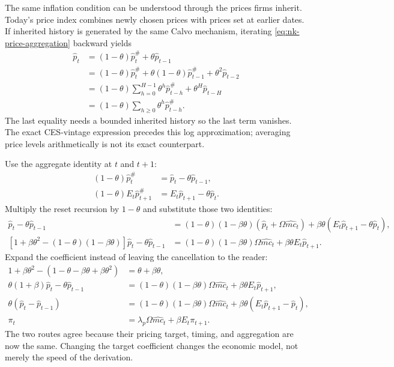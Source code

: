 The same inflation condition can be understood through the prices firms inherit.
Today's price index combines newly chosen prices with prices set at earlier
dates. If inherited history is generated by the same Calvo mechanism, iterating
\eqref{eq:nk-price-aggregation} backward yields
\begin{align}
 \hat p_t&=(1-\theta)\hat p_t^{\#}+\theta\hat p_{t-1}\\
 &=(1-\theta)\hat p_t^{\#}
       +\theta(1-\theta)\hat p_{t-1}^{\#}+\theta^2\hat p_{t-2}\\
 &=(1-\theta)\sum_{h=0}^{H-1}\theta^h\hat p_{t-h}^{\#}
                                     +\theta^H\hat p_{t-H}\\
 &=(1-\theta)\sum_{h\geq0}\theta^h\hat p_{t-h}^{\#}.
\end{align}
The last equality needs a bounded inherited history so the last term vanishes.
The exact CES-vintage expression precedes this log approximation; averaging
price levels arithmetically is not its exact counterpart.

Use the aggregate identity at $t$ and $t+1$:
\begin{align}
 (1-\theta)\hat p_t^{\#}&=\hat p_t-\theta\hat p_{t-1},\\
 (1-\theta)E_t\hat p_{t+1}^{\#}&=E_t\hat p_{t+1}-\theta\hat p_t.
\end{align}
Multiply the reset recursion by $1-\theta$ and substitute those two identities:
\begin{align}
 \hat p_t-\theta\hat p_{t-1}
 &=(1-\theta)(1-\beta\theta)
       (\hat p_t+\Omega\hat{mc}_t)
                 +\beta\theta(E_t\hat p_{t+1}-\theta\hat p_t),\\
 [1+\beta\theta^2-(1-\theta)(1-\beta\theta)]\hat p_t
       -\theta\hat p_{t-1}
 &=(1-\theta)(1-\beta\theta)\Omega\hat{mc}_t
                         +\beta\theta E_t\hat p_{t+1}.
\end{align}
Expand the coefficient instead of leaving the cancellation to the reader:
\begin{align}
 1+\beta\theta^2-(1-\theta-\beta\theta+\beta\theta^2)
 &=\theta+\beta\theta,\\
 \theta(1+\beta)\hat p_t-\theta\hat p_{t-1}
 &=(1-\theta)(1-\beta\theta)\Omega\hat{mc}_t
                       +\beta\theta E_t\hat p_{t+1},\\
 \theta(\hat p_t-\hat p_{t-1})
 &=(1-\theta)(1-\beta\theta)\Omega\hat{mc}_t
                    +\beta\theta(E_t\hat p_{t+1}-\hat p_t),\\
 \pi_t&=\lambda_p\Omega\hat{mc}_t+\beta E_t\pi_{t+1}.
\end{align}
The two routes agree because their pricing target, timing, and aggregation
are now the same. Changing the target coefficient changes the economic model,
not merely the speed of the derivation.

